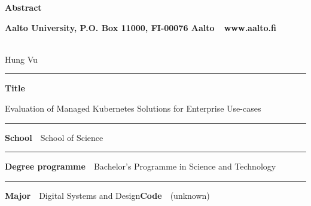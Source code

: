 
\newpage
{}
{}


\begin{spacing}{.88}

{\parindent0pt %

{\fontsize{13.9pt}{13.9pt}\selectfont
\vspace{-8.9mm}\hfill{\bfseries\sffamily\lsstyle Abstract}}

{\fontsize{9.48pt}{9.48pt}\selectfont
\vspace{.9mm}\hfill{\bfseries\sffamily\lsstyle Aalto University, P.O. Box 11000, FI-00076 Aalto~~\textcolor{aaltoGray}{www.aalto.fi}}}

\\
{\small Hung Vu}

\vspace{-2.4mm}\rule{\textwidth}{.75pt}

{\fontsize{10.5pt}{10.5pt}\bfseries\sffamily\lsstyle Title}\\
\parbox[t]{\textwidth}{\raggedright\small Evaluation of Managed Kubernetes Solutions for Enterprise Use-cases}

\vspace{.5mm}\rule{\textwidth}{.75pt}

{\fontsize{10.5pt}{10.5pt}\bfseries\sffamily\lsstyle School}~~{\small School of Science}

\vspace{-2.4mm}\rule{\textwidth}{.75pt}

{\fontsize{10.5pt}{10.5pt}\bfseries\sffamily\lsstyle Degree programme}~~{\small Bachelor’s Programme in Science and Technology}

\vspace{-2.4mm}\rule{\textwidth}{.75pt}

{\fontsize{10.5pt}{10.5pt}\bfseries\sffamily\lsstyle Major}~~{\small Digital Systems and Design}\hfill{\fontsize{10.5pt}{10.5pt}\bfseries\sffamily\lsstyle Code}~~{\small (unknown)}

}
\end{spacing}
